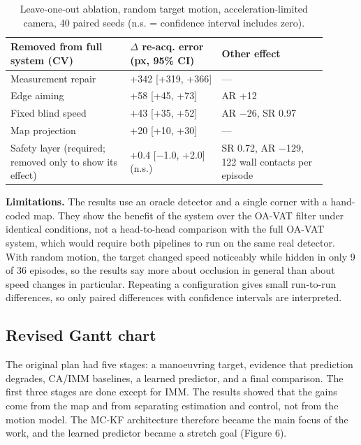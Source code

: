 \documentclass[12pt,a4paper]{article}
\begin{document}
\begin{table}[htbp]
  \centering
  \small
  \caption{Leave-one-out ablation, random target motion, acceleration-limited camera, 40 paired seeds (n.s. = confidence interval includes zero).}
  \renewcommand{\arraystretch}{1.15}
  \begin{tabular}{>{\raggedright\arraybackslash}p{0.34\linewidth}>{\raggedright\arraybackslash}p{0.26\linewidth}>{\raggedright\arraybackslash}p{0.30\linewidth}}
  \toprule
  \textbf{Removed from full system (CV)} & \textbf{$\Delta$ re-acq. error (px, 95\% CI)} & \textbf{Other effect} \\
  \midrule
  Measurement repair & +342 [+319, +366] & — \\
  Edge aiming & +58 [+45, +73] & AR +12 \\
  Fixed blind speed & +43 [+35, +52] & AR $-$26, SR 0.97 \\
  Map projection & +20 [+10, +30] & — \\
  Safety layer (required; removed only to show its effect) & +0.4 [$-$1.0, +2.0] (n.s.) & SR 0.72, AR $-$129, 122 wall contacts per episode \\
  \bottomrule
  \end{tabular}
\end{table}

\textbf{Limitations.} The results use an oracle detector and a single corner with a hand-coded map. They show the benefit of the system over the OA-VAT filter under identical conditions, not a head-to-head comparison with the full OA-VAT system, which would require both pipelines to run on the same real detector. With random motion, the target changed speed noticeably while hidden in only 9 of 36 episodes, so the results say more about occlusion in general than about speed changes in particular. Repeating a configuration gives small run-to-run differences, so only paired differences with confidence intervals are interpreted.

\subsection{Revised Gantt chart}
The original plan had five stages: a manoeuvring target, evidence that prediction degrades, CA/IMM baselines, a learned predictor, and a final comparison. The first three stages are done except for IMM. The results showed that the gains come from the map and from separating estimation and control, not from the motion model. The MC-KF architecture therefore became the main focus of the work, and the learned predictor became a stretch goal (Figure 6).
\end{document}
